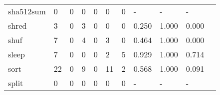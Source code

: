 \begin{longtable}{lp{1.2cm}p{1.2cm}p{1.2cm}p{1.2cm}p{1.2cm}p{1.2cm}p{1.2cm}p{1.2cm}p{1.2cm}p{1.2cm}}
sha512sum &                                     0 &                                                  0 &                                                0 &                                               0 &                                                0 &                                              0 &                                                  - &                                                  - &                                                  - \\
shred     &                                     3 &                                                  0 &                                                3 &                                               0 &                                                0 &                                              0 &                                              0.250 &                                              1.000 &                                              0.000 \\
shuf      &                                     7 &                                                  0 &                                                4 &                                               0 &                                                3 &                                              0 &                                              0.464 &                                              1.000 &                                              0.000 \\
sleep     &                                     7 &                                                  0 &                                                0 &                                               0 &                                                2 &                                              5 &                                              0.929 &                                              1.000 &                                              0.714 \\
sort      &                                    22 &                                                  0 &                                                9 &                                               0 &                                               11 &                                              2 &                                              0.568 &                                              1.000 &                                              0.091 \\
split     &                                     0 &                                                  0 &                                                0 &                                               0 &                                                0 &                                              0 &                                                  - &                                                  - &                                                  - \\

\end{longtable}
